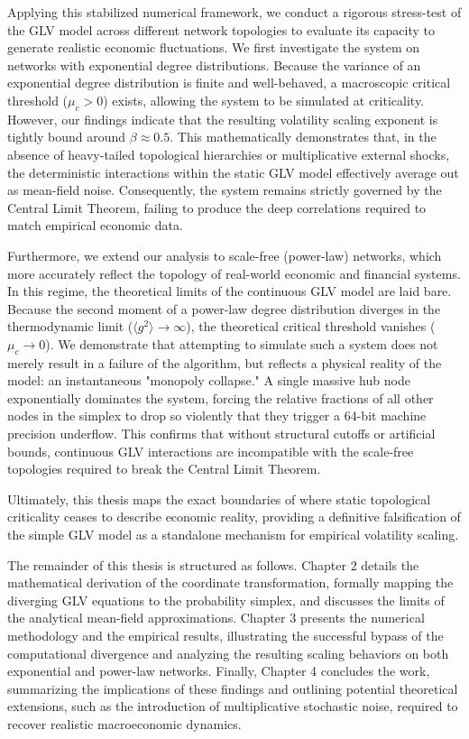 Applying this stabilized numerical framework, we conduct a rigorous stress-test of the GLV model across different network topologies to evaluate its capacity to generate realistic economic fluctuations. We first investigate the system on networks with exponential degree distributions. Because the variance of an exponential degree distribution is finite and well-behaved, a macroscopic critical threshold ($\mu_c > 0$) exists, allowing the system to be simulated at criticality. However, our findings indicate that the resulting volatility scaling exponent is tightly bound around $\beta \approx 0.5$. This mathematically demonstrates that, in the absence of heavy-tailed topological hierarchies or multiplicative external shocks, the deterministic interactions within the static GLV model effectively average out as mean-field noise. Consequently, the system remains strictly governed by the Central Limit Theorem, failing to produce the deep correlations required to match empirical economic data.

Furthermore, we extend our analysis to scale-free (power-law) networks, which more accurately reflect the topology of real-world economic and financial systems. In this regime, the theoretical limits of the continuous GLV model are laid bare. Because the second moment of a power-law degree distribution diverges in the thermodynamic limit ($\langle g^2 \rangle \to \infty$), the theoretical critical threshold vanishes ($\mu_c \to 0$). We demonstrate that attempting to simulate such a system does not merely result in a failure of the algorithm, but reflects a physical reality of the model: an instantaneous "monopoly collapse." A single massive hub node exponentially dominates the system, forcing the relative fractions of all other nodes in the simplex to drop so violently that they trigger a 64-bit machine precision underflow. This confirms that without structural cutoffs or artificial bounds, continuous GLV interactions are incompatible with the scale-free topologies required to break the Central Limit Theorem.

Ultimately, this thesis maps the exact boundaries of where static topological criticality ceases to describe economic reality, providing a definitive falsification of the simple GLV model as a standalone mechanism for empirical volatility scaling.

The remainder of this thesis is structured as follows. Chapter 2 details the mathematical derivation of the coordinate transformation, formally mapping the diverging GLV equations to the probability simplex, and discusses the limits of the analytical mean-field approximations. Chapter 3 presents the numerical methodology and the empirical results, illustrating the successful bypass of the computational divergence and analyzing the resulting scaling behaviors on both exponential and power-law networks. Finally, Chapter 4 concludes the work, summarizing the implications of these findings and outlining potential theoretical extensions, such as the introduction of multiplicative stochastic noise, required to recover realistic macroeconomic dynamics.

